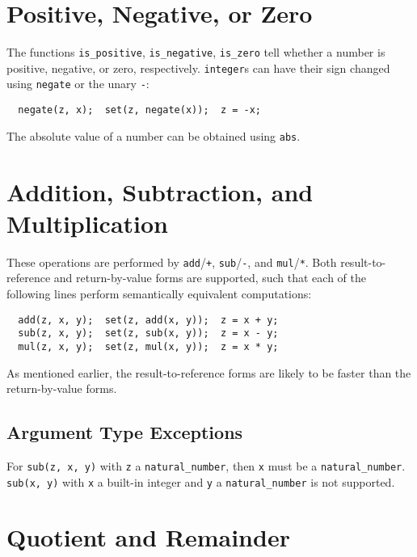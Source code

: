 \documentclass[a4paper]{article}
\begin{document}
\section{Positive, Negative, or Zero}

The functions \texttt{is\_positive}, \texttt{is\_negative}, \texttt{is\_zero} tell whether a number is positive, negative, or zero, respectively. \texttt{integer}s can have their sign changed using \texttt{negate} or the unary \texttt{-}:
\begin{verbatim}
  negate(z, x);  set(z, negate(x));  z = -x;
\end{verbatim}

The absolute value of a number can be obtained using \texttt{abs}.


\section{Addition, Subtraction, and Multiplication}

These operations are performed by \texttt{add}/\texttt{+}, \texttt{sub}/\texttt{-}, and \texttt{mul}/\texttt{*}. Both result-to-reference and return-by-value forms are supported, such that each of the following lines perform semantically equivalent computations:
\begin{verbatim}
  add(z, x, y);  set(z, add(x, y));  z = x + y;
  sub(z, x, y);  set(z, sub(x, y));  z = x - y;
  mul(z, x, y);  set(z, mul(x, y));  z = x * y;
\end{verbatim}
As mentioned earlier, the result-to-reference forms are likely to be faster than the return-by-value forms.

\subsection{Argument Type Exceptions}

For \texttt{sub(z, x, y)} with \texttt{z} a \texttt{natural\_number}, then \texttt{x} must be a \texttt{natural\_number}. \texttt{sub(x, y)} with \texttt{x} a built-in integer and \texttt{y} a \texttt{natural\_number} is not supported.

\section{Quotient and Remainder}
\end{document}
